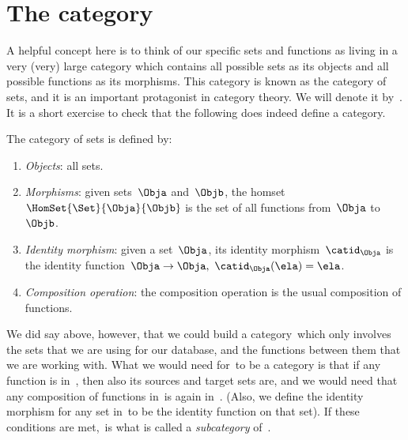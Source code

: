
\section{The category \Set}

A helpful concept here is to think of our specific sets and functions as living in a very (very) large category which contains all possible sets as its objects and all possible functions as its morphisms.
This category is known as the category of sets, and it is an important protagonist in category theory.
We will denote it by~\Set.
It is a short exercise to check that the following does indeed define a category.

\begin{ctdefinition}
    \label{def:Set}
    The category of sets \iindex{\Set} is defined by:
    \begin{enumerate}
        \item \emph{Objects}: all sets.
        \item \emph{Morphisms}: given sets~$\Obja$ and~$\Objb$, the homset~$\HomSet{\Set}{\Obja}{\Objb}$ is the set of all functions from~$\Obja$ to~$\Objb$.
        \item \emph{Identity morphism}: given a set~$\Obja$, its identity morphism~$\catid_\Obja$ is the identity function~$\Obja \to \Obja, \ \catid_\Obja(\ela) = \ela$.
        \item \emph{Composition operation}: the composition operation is the usual composition of functions.
    \end{enumerate}
\end{ctdefinition}

We did say above, however, that we could build a category~\Database which only involves the sets that we are using for our database, and the functions between them that we are working with.
What we would need for~\Database to be a category is that if any function is in~\Database, then also its sources and target sets are, and we would need that any composition of functions in~\Database is again in~\Database.
(Also, we define the identity morphism for any set in~\Database to be the identity function on that set).
If these conditions are met,~\Database is what is called a \emph{subcategory} of~\Set.
